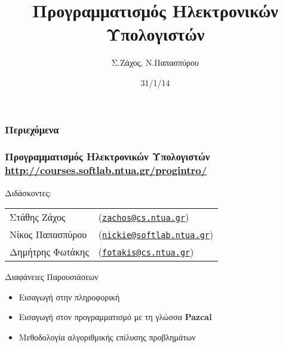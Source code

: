 \documentclass{beamer}
\title[Προγραμματισμός Ηλεκτρονικών Υπολογιστών]{Προγραμματισμός Ηλεκτρονικών Υπολογιστών}
\author[Σ.Ζάχος, Ν.Παπασπύρου]{Σ.Ζάχος, Ν.Παπασπύρου}
\date[1/14]{31/1/14}
\begin{document}
\begin{frame}
	\titlepage
\end{frame}

\begin{frame}
  \frametitle{Περιεχόμενα}
    \tableofcontents%
\end{frame}

\begin{frame}
	\frametitle{Προγραμματισμός Ηλεκτρονικών Υπολογιστών\\
		\url{http://courses.softlab.ntua.gr/progintro/}}

	Διδάσκοντες:
	\begin{tabular}{ll}
	  Στάθης Ζάχος & (\href{mailto:zachos@cs.ntua.gr}{\nolinkurl{zachos@cs.ntua.gr}}) \\
	  Νίκος Παπασπύρου & (\href{mailto:nickie@softlab.ntua.gr}{\nolinkurl{nickie@softlab.ntua.gr}}) \\
	  Δημήτρης Φωτάκης & (\href{mailto:fotakis@cs.ntua.gr}{\nolinkurl{fotakis@cs.ntua.gr}})
	\end{tabular}
	\vskip20pt

	\begin{center}{\large Διαφάνειες Παρουσιάσεων}\end{center}
	\begin{itemize}
	  \item[\checkmark] Εισαγωγή στην πληροφορική
		\item[\checkmark] Εισαγωγή στον προγραμματισμό με τη γλώσσα
			\textbf{{\color{officegreen}Pa{\color{red}z}cal}}
	  \item[\checkmark] Μεθοδολογία αλγοριθμικής επίλυσης προβλημάτων
	\end{itemize}
\end{frame}

\end{document}
